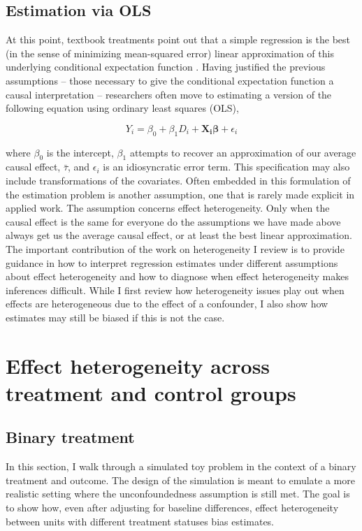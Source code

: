 \documentclass[hidelinks,11pt]{article}
\begin{document}
\subsection{Estimation via OLS}

At this point, textbook treatments point out that a simple regression is the best (in the sense of minimizing mean-squared error) linear approximation of this underlying conditional expectation function \citep{angristpischke2008}. Having justified the previous assumptions -- those necessary to give the conditional expectation function a causal interpretation -- researchers often move to estimating a version of the following equation using ordinary least squares (OLS),

$$Y_i = \beta_0 + \beta_1 D_i + \boldsymbol{X_i} \boldsymbol{\beta} + \epsilon_i$$

where $\beta_0$ is the intercept, $\beta_1$ attempts to recover an approximation of our average causal effect, $\bar \tau$, and $\epsilon_i$ is an idiosyncratic error term. This specification may also include transformations of the covariates. Often embedded in this formulation of the estimation problem is another assumption, one that is rarely made explicit in applied work. The assumption concerns effect heterogeneity. Only when the causal effect is the same for everyone do the assumptions we have made above always get us the average causal effect, or at least the best linear approximation. The important contribution of the work on heterogeneity I review is to provide guidance in how to interpret regression estimates under different assumptions about effect heterogeneity and how to diagnose when effect heterogeneity makes inferences difficult. While I first review how heterogeneity issues play out when effects are heterogeneous due to the effect of a confounder, I also show how estimates may still be biased if this is not the case.

\section{Effect heterogeneity across treatment and control groups}

\subsection{Binary treatment}

In this section, I walk through a simulated toy problem in the context of a binary treatment and outcome. The design of the simulation is meant to emulate a more realistic setting where the unconfoundedness assumption is still met. The goal is to show how, even after adjusting for baseline differences, effect heterogeneity between units with different treatment statuses bias estimates.
\end{document}
